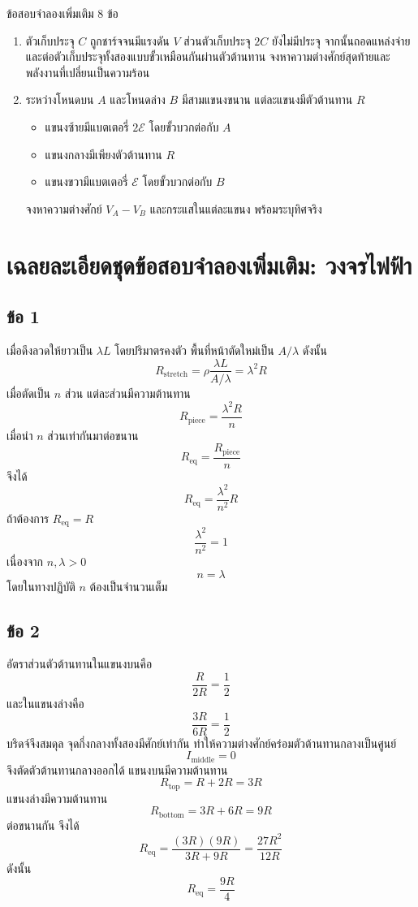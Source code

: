 \begin{exercisebox}{ข้อสอบจำลองเพิ่มเติม 8 ข้อ}
\begin{enumerate}
    \item ตัวเก็บประจุ $C$ ถูกชาร์จจนมีแรงดัน $V$ ส่วนตัวเก็บประจุ $2C$ ยังไม่มีประจุ จากนั้นถอดแหล่งจ่ายและต่อตัวเก็บประจุทั้งสองแบบขั้วเหมือนกันผ่านตัวต้านทาน จงหาความต่างศักย์สุดท้ายและพลังงานที่เปลี่ยนเป็นความร้อน

    \item ระหว่างโหนดบน $A$ และโหนดล่าง $B$ มีสามแขนงขนาน แต่ละแขนงมีตัวต้านทาน $R$
    \begin{itemize}
        \item แขนงซ้ายมีแบตเตอรี่ $2\mathcal E$ โดยขั้วบวกต่อกับ $A$
        \item แขนงกลางมีเพียงตัวต้านทาน $R$
        \item แขนงขวามีแบตเตอรี่ $\mathcal E$ โดยขั้วบวกต่อกับ $B$
    \end{itemize}
    จงหาความต่างศักย์ $V_A-V_B$ และกระแสในแต่ละแขนง พร้อมระบุทิศจริง
\end{enumerate}
\end{exercisebox}

\section{เฉลยละเอียดชุดข้อสอบจำลองเพิ่มเติม: วงจรไฟฟ้า}

\subsection*{ข้อ 1}
เมื่อดึงลวดให้ยาวเป็น $\lambda L$ โดยปริมาตรคงตัว พื้นที่หน้าตัดใหม่เป็น $A/\lambda$ ดังนั้น
\[
R_{\text{stretch}}=\rho\frac{\lambda L}{A/\lambda}=\lambda^2R
\]
เมื่อตัดเป็น $n$ ส่วน แต่ละส่วนมีความต้านทาน
\[
R_{\text{piece}}=\frac{\lambda^2R}{n}
\]
เมื่อนำ $n$ ส่วนเท่ากันมาต่อขนาน
\[
R_{\text{eq}}=\frac{R_{\text{piece}}}{n}
\]
จึงได้
\[
\boxed{R_{\text{eq}}=\frac{\lambda^2}{n^2}R}
\]
ถ้าต้องการ $R_{\text{eq}}=R$
\[
\frac{\lambda^2}{n^2}=1
\]
เนื่องจาก $n,\lambda>0$
\[
\boxed{n=\lambda}
\]
โดยในทางปฏิบัติ $n$ ต้องเป็นจำนวนเต็ม

\subsection*{ข้อ 2}
อัตราส่วนตัวต้านทานในแขนงบนคือ
\[
\frac{R}{2R}=\frac12
\]
และในแขนงล่างคือ
\[
\frac{3R}{6R}=\frac12
\]
บริดจ์จึงสมดุล จุดกึ่งกลางทั้งสองมีศักย์เท่ากัน ทำให้ความต่างศักย์คร่อมตัวต้านทานกลางเป็นศูนย์
\[
\boxed{I_{\text{middle}}=0}
\]
จึงตัดตัวต้านทานกลางออกได้ แขนงบนมีความต้านทาน
\[
R_{\text{top}}=R+2R=3R
\]
แขนงล่างมีความต้านทาน
\[
R_{\text{bottom}}=3R+6R=9R
\]
ต่อขนานกัน จึงได้
\[
R_{\text{eq}}=\frac{(3R)(9R)}{3R+9R}
=\frac{27R^2}{12R}
\]
ดังนั้น
\[
\boxed{R_{\text{eq}}=\frac{9R}{4}}
\]

